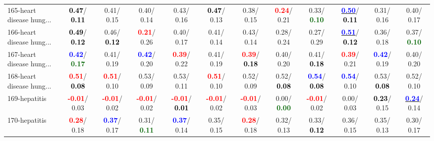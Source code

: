 \begin{table}[h]
\begin{center}
{\begin{tabular}{lc|c|c|c|c|c|c|c|c|c|c}
165-heart disease hung... & \textcolor{black}{\textbf{  0.47}}/\textcolor{black}{\textbf{  0.11}} &   0.41/  0.15 &   0.40/  0.14 &   0.43/  0.16 & \textcolor{black}{\textbf{  0.47}}/  0.13 &   0.38/  0.15 & \textcolor{red}{\textbf{  0.24}}/  0.21 &   0.33/\textcolor{darkgreen}{\textbf{  0.10}} & \underline{\textcolor{blue}{\textbf{  0.50}}}/\textcolor{black}{\textbf{  0.11}} &   0.31/  0.16 &   0.40/  0.17 \\
166-heart disease hung... & \textcolor{black}{\textbf{  0.49}}/\textcolor{black}{\textbf{  0.12}} &   0.46/\textcolor{black}{\textbf{  0.12}} & \textcolor{red}{\textbf{  0.21}}/  0.26 &   0.40/  0.17 &   0.41/  0.14 &   0.43/  0.14 &   0.28/  0.24 &   0.27/  0.29 & \underline{\textcolor{blue}{\textbf{  0.51}}}/\textcolor{black}{\textbf{  0.12}} &   0.36/  0.18 &   0.37/\textcolor{darkgreen}{\textbf{  0.10}} \\
167-heart disease hung... & \textcolor{blue}{\textbf{  0.42}}/\textcolor{darkgreen}{\textbf{  0.17}} &   0.41/  0.19 & \textcolor{blue}{\textbf{  0.42}}/  0.20 & \textcolor{red}{\textbf{  0.39}}/  0.22 &   0.41/  0.19 & \textcolor{red}{\textbf{  0.39}}/\textcolor{black}{\textbf{  0.18}} &   0.40/  0.20 &   0.41/\textcolor{black}{\textbf{  0.18}} & \textcolor{red}{\textbf{  0.39}}/  0.21 & \textcolor{blue}{\textbf{  0.42}}/  0.19 &   0.40/  0.20 \\ \hline
168-heart disease hung... & \textcolor{red}{\textbf{  0.51}}/\textcolor{black}{\textbf{  0.08}} & \textcolor{red}{\textbf{  0.51}}/  0.10 &   0.53/  0.09 &   0.53/  0.11 & \textcolor{red}{\textbf{  0.51}}/  0.10 &   0.52/  0.09 &   0.52/\textcolor{black}{\textbf{  0.08}} & \textcolor{blue}{\textbf{  0.54}}/\textcolor{black}{\textbf{  0.08}} & \textcolor{blue}{\textbf{  0.54}}/  0.10 &   0.53/\textcolor{black}{\textbf{  0.08}} &   0.52/  0.10 \\
169-hepatitis & \textcolor{red}{\textbf{ -0.01}}/  0.03 & \textcolor{red}{\textbf{ -0.01}}/  0.02 & \textcolor{red}{\textbf{ -0.01}}/  0.02 & \textcolor{red}{\textbf{ -0.01}}/\textcolor{black}{\textbf{  0.01}} & \textcolor{red}{\textbf{ -0.01}}/  0.02 & \textcolor{red}{\textbf{ -0.01}}/  0.03 &   0.00/\textcolor{darkgreen}{\textbf{  0.00}} & \textcolor{red}{\textbf{ -0.01}}/  0.02 &   0.00/  0.03 & \textcolor{black}{\textbf{  0.23}}/  0.15 & \underline{\textcolor{blue}{\textbf{  0.24}}}/  0.14 \\
170-hepatitis & \textcolor{red}{\textbf{  0.28}}/  0.18 & \textcolor{blue}{\textbf{  0.37}}/  0.17 &   0.31/\textcolor{darkgreen}{\textbf{  0.11}} & \textcolor{blue}{\textbf{  0.37}}/  0.14 &   0.35/  0.15 & \textcolor{red}{\textbf{  0.28}}/  0.18 &   0.32/  0.13 &   0.33/\textcolor{black}{\textbf{  0.12}} &   0.36/  0.15 &   0.35/  0.13 &   0.30/  0.17 \\

\end{tabular}}
\end{center}
\end{table}
